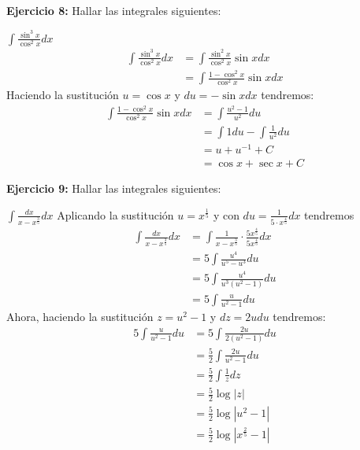 \documentclass[../main.tex]{subfiles}
\begin{document}
    \question \textbf{Ejercicio 8:} Hallar las integrales siguientes:
    \begin{partes}
        \parte $\int \frac{\sin^3 x}{\cos^2 x} dx$
        \begin{align*}
            \int \frac{\sin^3 x}{\cos^2 x} dx &= \int \frac{\sin^2 x}{\cos^2 x} \sin x dx\\
            &= \int \frac{1-\cos^2 x}{\cos^2 x} \sin x dx
        \end{align*}
        Haciendo la sustitución $u = \cos x$ y $du = -\sin x dx$ tendremos:
        \begin{align*}
            \int \frac{1-\cos^2 x}{\cos^2 x} \sin x dx &= \int \frac{u^2 - 1}{u^2} du\\
            &= \int 1 du - \int \frac{1}{u^2} du\\
            &= u + u^{-1} + C\\
            &= \cos x + \sec x + C
        \end{align*}
    \end{partes}

    \question \textbf{Ejercicio 9:} Hallar las integrales siguientes:
    \begin{partes}
        \parte $\int \frac{dx}{x - x^{\frac{3}{5}}} dx$
        Aplicando la sustitución $u = x^\frac{1}{5}$ y con $du = \frac{1}{5 \cdot x^{\frac{4}{5}}} dx$ tendremos
        \begin{align*}
            \int \frac{dx}{x - x^{\frac{3}{5}}} dx &= \int \frac{1}{x- x^{\frac{3}{5}}} \cdot \frac{5x^{\frac{4}{5}}}{5x^{\frac{4}{5}}} dx\\
            &= 5 \int \frac{u^4}{u^5 - u^3} du\\
            &= 5 \int \frac{u^4}{u^3(u^2 -1)} du\\
            &= 5 \int \frac{u}{u^2-1} du
        \end{align*}
        Ahora, haciendo la sustitución $z = u^2-1$ y $dz = 2u du$ tendremos:
        \begin{align*}
            5 \int \frac{u}{u^2-1} du &= 5 \int \frac{2u}{2(u^2-1)} du\\
            &= \frac{5}{2} \int \frac{2u}{u^2-1} du\\
            &= \frac{5}{2} \int \frac{1}{z} dz\\
            &= \frac{5}{2} \log|z|\\
            &= \frac{5}{2} \log|u^2-1|\\
            &= \frac{5}{2} \log|x^{\frac{2}{5}}-1|\\
        \end{align*}
    \end{partes}
\end{document}
